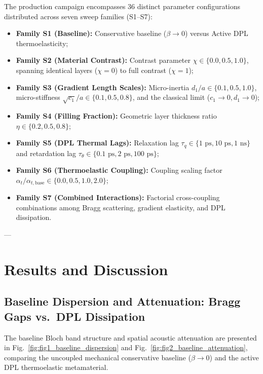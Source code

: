 \documentclass[11pt,a4paper]{article}
\begin{document}
The production campaign encompasses 36 distinct parameter configurations distributed across seven sweep families (S1--S7):
\begin{itemize}
    \item \textbf{Family S1 (Baseline):} Conservative baseline ($\beta \to 0$) versus Active DPL thermoelasticity;
    \item \textbf{Family S2 (Material Contrast):} Contrast parameter $\chi \in \{0.0, 0.5, 1.0\}$, spanning identical layers ($\chi = 0$) to full contrast ($\chi = 1$);
    \item \textbf{Family S3 (Gradient Length Scales):} Micro-inertia $d_1/a \in \{0.1, 0.5, 1.0\}$, micro-stiffness $\sqrt{c_1}/a \in \{0.1, 0.5, 0.8\}$, and the classical limit ($c_1 \to 0, d_1 \to 0$);
    \item \textbf{Family S4 (Filling Fraction):} Geometric layer thickness ratio $\eta \in \{0.2, 0.5, 0.8\}$;
    \item \textbf{Family S5 (DPL Thermal Lags):} Relaxation lag $\tau_q \in \{1\text{ ps}, 10\text{ ps}, 1\text{ ns}\}$ and retardation lag $\tau_\theta \in \{0.1\text{ ps}, 2\text{ ps}, 100\text{ ps}\}$;
    \item \textbf{Family S6 (Thermoelastic Coupling):} Coupling scaling factor $\alpha_t / \alpha_{t,\text{base}} \in \{0.0, 0.5, 1.0, 2.0\}$;
    \item \textbf{Family S7 (Combined Interactions):} Factorial cross-coupling combinations among Bragg scattering, gradient elasticity, and DPL dissipation.
\end{itemize}

---

\section{Results and Discussion}
\label{sec:results}

\subsection{Baseline Dispersion and Attenuation: Bragg Gaps vs.\ DPL Dissipation}
\label{sec:res_s1}

The baseline Bloch band structure and spatial acoustic attenuation are presented in Fig.~\ref{fig:fig1_baseline_dispersion} and Fig.~\ref{fig:fig2_baseline_attenuation}, comparing the uncoupled mechanical conservative baseline ($\beta \to 0$) and the active DPL thermoelastic metamaterial.
\end{document}

